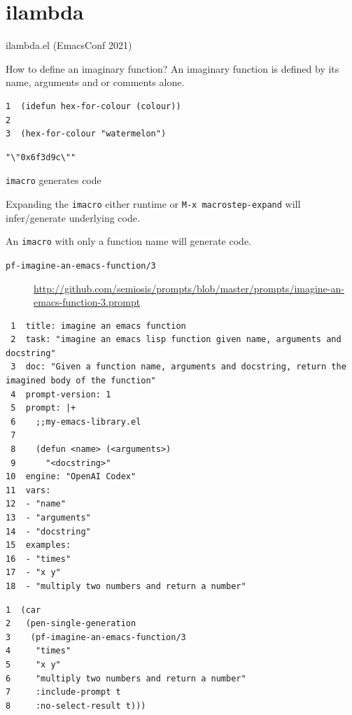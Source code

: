 \documentclass[presentation]{beamer}
\begin{document}
\section{ilambda}
\label{sec:orgca32a27}
\begin{frame}[label={sec:orgbf8b945},fragile]{ilambda.el (EmacsConf 2021)}
 \begin{block}{How to define an imaginary function?}
An imaginary function is defined by its name,
arguments and or comments alone.

{\tiny
\begin{verbatim}
1  (idefun hex-for-colour (colour))
2  
3  (hex-for-colour "watermelon")
\end{verbatim}
}

\begin{verbatim}
"\"0x6f3d9c\""
\end{verbatim}
\end{block}

\begin{block}{\texttt{imacro} generates code}
{\tiny
Expanding the \texttt{imacro} either runtime or 
\texttt{M-x macrostep-expand}
will infer/generate underlying code.

An \texttt{imacro} with only a function name will generate code.
}

\begin{description}
\item[{\texttt{pf-imagine-an-emacs-function/3}}] \url{http://github.com/semiosis/prompts/blob/master/prompts/imagine-an-emacs-function-3.prompt}
\end{description}

\begin{verbatim}
 1  title: imagine an emacs function
 2  task: "imagine an emacs lisp function given name, arguments and docstring"
 3  doc: "Given a function name, arguments and docstring, return the imagined body of the function"
 4  prompt-version: 1
 5  prompt: |+
 6    ;;my-emacs-library.el
 7  
 8    (defun <name> (<arguments>)
 9      "<docstring>"
10  engine: "OpenAI Codex"
11  vars:
12  - "name"
13  - "arguments"
14  - "docstring"
15  examples:
16  - "times"
17  - "x y"
18  - "multiply two numbers and return a number"
\end{verbatim}

\begin{verbatim}
1  (car
2   (pen-single-generation
3    (pf-imagine-an-emacs-function/3
4     "times"
5     "x y"
6     "multiply two numbers and return a number"
7     :include-prompt t
8     :no-select-result t)))
\end{verbatim}


\end{block}
\end{frame}
\end{document}

